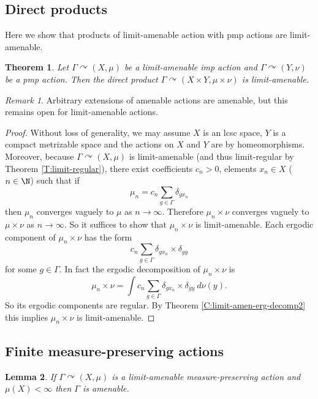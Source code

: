 \documentclass[12pt]{article}
\theoremstyle{plain}
\newtheorem{thm}{Theorem}[section]
\newtheorem{lem}[thm]{Lemma}
\theoremstyle{definition}
\theoremstyle{remark}
\newtheorem{remark}{Remark}
\newcommand{\G}{\Gamma}
\renewcommand\d{\delta}
\def\cc{{\curvearrowright}}
\begin{document}
\subsection{Direct products}

Here we show that products of limit-amenable action with pmp actions are limit-amenable. 

\begin{thm}\label{T:extensions}
Let $\G \cc (X,\mu)$ be a limit-amenable imp action and $\G \cc (Y,\nu)$ be a pmp action. Then the direct product $\G \cc (X\times Y, \mu \times \nu)$ is limit-amenable.
\end{thm}

\begin{remark}
    Arbitrary extensions of amenable actions are amenable, but this remains open for limit-amenable actions.
\end{remark}

\begin{proof}
Without loss of generality, we may assume $X$ is an lcsc space, $Y$ is a compact metrizable space and the actions on $X$ and $Y$ are by homeomorphisms. Moreover, because $\G \cc (X,\mu)$ is limit-amenable (and thus limit-regular by Theorem \ref{T:limit-regular}), there exist coefficients $c_{n}>0$, elements $x_n \in X$ ($n\in \N$) such that if 
$$\mu_n = c_n\sum_{g\in \G} \d_{gx_n}$$
then $\mu_n$ converges vaguely to $\mu$ as $n\to\infty$. Therefore $\mu_n \times \nu$ converges vaguely to $\mu\times \nu$ as $n\to\infty$. So it suffices to show that $\mu_n \times \nu$ is limit-amenable. Each ergodic component of $\mu_n\times \nu$ has the form 
$$c_n\sum_{g\in \G} \d_{gx_n} \times \d_{gy}$$
for some $g\in \G$. In fact the ergodic decomposition of $\mu_n \times \nu$ is 
$$\mu_n \times \nu = \int c_n\sum_{g\in \G} \d_{gx_n} \times \d_{gy}~d\nu(y).$$
So its ergodic components are regular. By Theorem \ref{C:limit-amen-erg-decomp2} this implies $\mu_n \times \nu$ is limit-amenable.
\end{proof} 

\subsection{Finite measure-preserving actions}


\begin{lem}\label{C:non-amen100}
    If $\G \cc (X,\mu)$ is a limit-amenable measure-preserving action and $\mu(X)<\infty$ then $\G$ is amenable.
\end{lem}
\end{document}
